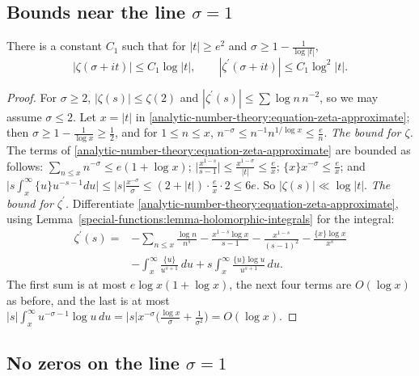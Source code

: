 \subsection{Bounds near the line $\sigma = 1$}\label{analytic-number-theory:subsection-zeta-bounds}

\begin{proposition}\label{analytic-number-theory:proposition-zeta-bounds}
There is a constant $C_1$ such that for $|t| \geq e^2$ and $\sigma \geq 1 - \frac{1}{\log|t|}$,
\[
|\zeta(\sigma + it)| \leq C_1\log|t|, \qquad |\zeta^{\prime}(\sigma + it)| \leq C_1\log^2|t|.
\]
\end{proposition}

\begin{proof}
For $\sigma \geq 2$, $|\zeta(s)| \leq \zeta(2)$ and $|\zeta^{\prime}(s)| \leq \sum\log n\,n^{-2}$, so we may assume $\sigma \leq 2$. Let $x = |t|$ in
\eqref{analytic-number-theory:equation-zeta-approximate}; then $\sigma \geq 1 - \frac{1}{\log x} \geq \frac12$, and for $1 \leq n \leq x$, $n^{-\sigma} \leq n^{-1}n^{1/\log x} \leq \frac en$.
\emph{The bound for $\zeta$.} The terms of \eqref{analytic-number-theory:equation-zeta-approximate} are bounded as follows: $\sum_{n \leq x}n^{-\sigma} \leq e(1 + \log x)$;
$\bigl|\frac{x^{1-s}}{s - 1}\bigr| \leq \frac{x^{1-\sigma}}{|t|} \leq \frac{e}{x}$; $\{x\}x^{-\sigma} \leq \frac ex$; and
$\bigl|s\int_x^\infty\{u\}u^{-s-1}du\bigr| \leq |s|\frac{x^{-\sigma}}{\sigma} \leq (2 + |t|)\cdot\frac{e}{x}\cdot 2 \leq 6e$. So $|\zeta(s)| \ll \log|t|$.
\emph{The bound for $\zeta^{\prime}$.} Differentiate \eqref{analytic-number-theory:equation-zeta-approximate}, using Lemma~\ref{special-functions:lemma-holomorphic-integrals} for the integral:
\[
\begin{aligned}
\zeta^{\prime}(s) = &-\sum_{n \leq x}\frac{\log n}{n^s} - \frac{x^{1-s}\log x}{s - 1} - \frac{x^{1-s}}{(s - 1)^2} - \frac{\{x\}\log x}{x^s} \\
&- \int_x^\infty\frac{\{u\}}{u^{s+1}}\,du + s\int_x^\infty\frac{\{u\}\log u}{u^{s+1}}\,du.
\end{aligned}
\]
The first sum is at most $e\log x(1 + \log x)$, the next four terms are $O(\log x)$ as before, and the last is at most $|s|\int_x^\infty u^{-\sigma-1}\log u\,du = |s|x^{-\sigma}\bigl(\frac{\log x}{\sigma} + \frac{1}{\sigma^2}\bigr) = O(\log x)$.
\end{proof}

\subsection{No zeros on the line $\sigma = 1$}\label{analytic-number-theory:subsection-zeta-line-one}

